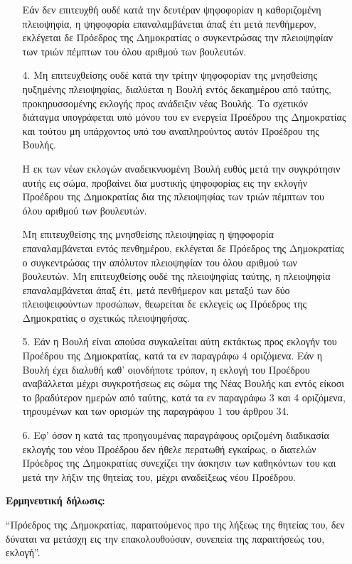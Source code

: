 \documentclass[twoside, a4paper, 10pt]{article}
\begin{document}
\begin{multicols}{2}
\begin{enumerate}
\begin{BigQuote}
\begin{enumerate}
Εάν δεν επιτευχθή ουδέ κατά την δευτέραν ψηφοφορίαν η καθοριζομένη πλειοψηφία, η ψηφοφορία επαναλαμβάνεται άπαξ έτι μετά πενθήμερον, εκλέγεται δε Πρόεδρος της Δημοκρατίας ο συγκεντρώσας την πλειοψηφίαν των τριών πέμπτων του όλου αριθμού των βουλευτών.
  \item[4.] Μη επιτευχθείσης ουδέ κατά την τρίτην ψηφοφορίαν της μνησθείσης  ηυξημένης πλειοψηφίας, διαλύεται η Βουλή εντός δεκαημέρου από ταύτης, προκηρυσσομένης εκλογής προς ανάδειξιν νέας Βουλής. Το σχετικόν διάταγμα υπογράφεται υπό μόνου του εν ενεργεία Προέδρου της Δημοκρατίας και τούτου μη υπάρχοντος υπό του αναπληρούντος αυτόν Προέδρου της Βουλής.

Η εκ των νέων εκλογών αναδεικνυομένη Βουλή ευθύς μετά την συγκρότησιν αυτής εις σώμα, προβαίνει δια μυστικής ψηφοφορίας εις την εκλογήν Προέδρου της Δημοκρατίας δια της πλειοψηφίας των τριών πέμπτων του όλου αριθμού των βουλευτών.

Μη επιτευχθείσης της μνησθείσης πλειοψηφίας η ψηφοφορία επαναλαμβάνεται εντός πενθημέρου, εκλέγεται δε Πρόεδρος της Δημοκρατίας ο συγκεντρώσας την απόλυτον πλειοψηφίαν του όλου αριθμού των βουλευτών. Μη επιτευχθείσης ουδέ της πλειοψηφίας ταύτης, η πλειοψηφία επαναλαμβάνεται άπαξ έτι, μετά πενθήμερον και μεταξύ των δύο πλειοψειφούντων προσώπων, θεωρείται δε εκλεγείς ως Πρόεδρος της Δημοκρατίας ο σχετικώς πλειοψηφήσας.
  \item[5.] Εάν η Βουλή είναι απούσα συγκαλείται αύτη εκτάκτως προς εκλογήν του Προέδρου της Δημοκρατίας, κατά τα εν παραγράφω 4 οριζόμενα.
Εάν η Βουλή έχει διαλυθή καθ' οιονδήποτε τρόπον, η εκλογή του Προέδρου αναβάλλεται μέχρι συγκροτήσεως εις σώμα της Νέας Βουλής και εντός είκοσι το βραδύτερον ημερών από ταύτης, κατά τα εν παραγράφω 3 και 4 οριζόμενα, τηρουμένων και των ορισμών της παραγράφου 1 του άρθρου 34.
  \item[6.] Εφ' όσον η κατά τας προηγουμένας παραγράφους οριζομένη διαδικασία εκλογής του νέου Προέδρου δεν ήθελε περατωθή εγκαίρως, ο διατελών Πρόεδρος της Δημοκρατίας συνεχίζει την άσκησιν των καθηκόντων του και μετά την λήξιν της θητείας του, μέχρι αναδείξεως νέου Προέδρου.
\end{enumerate}
\textbf{Ερμηνευτική δήλωσις:}

“Πρόεδρος της Δημοκρατίας, παραιτούμενος  προ της λήξεως της θητείας του, δεν δύναται να μετάσχη εις την επακολουθούσαν, συνεπεία της παραιτήσεώς του, εκλογή”.


\end{BigQuote}
\end{enumerate}
\end{multicols}
\end{document}
